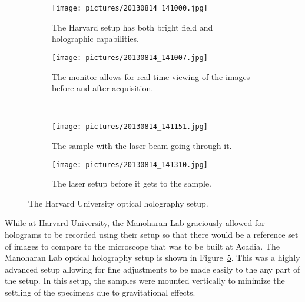 \begin{figure}[ht!]
    \begin{center}

        \begin{subfigure}[t]{0.4\textwidth}
            \label{fig:second}
            \texttt{[image: pictures/20130814\_141000.jpg]}
            \caption{The Harvard setup has both bright field and holographic
            capabilities.}
        \end{subfigure}
                \hspace*{\fill}
        \begin{subfigure}[t]{0.4\textwidth}
            \label{fig:third}
            \texttt{[image: pictures/20130814\_141007.jpg]}
            \caption{The monitor allows for real time viewing of the images
            before and after acquisition.}
        \end{subfigure}
        \\

        \begin{subfigure}[t]{0.4\textwidth}
            \label{fig:fourth}
            \texttt{[image: pictures/20130814\_141151.jpg]}
            \caption{The sample with the laser beam going through it.}
        \end{subfigure}
        \hspace*{\fill}
        \begin{subfigure}[t]{0.4\textwidth}%
            \label{fig:fifth}
            \texttt{[image: pictures/20130814\_141310.jpg]}
            \caption{The laser setup before it gets to the sample.}
        \end{subfigure}

    \end{center}
    \caption{%
        The Harvard University optical holography setup.
    }%
    \label{fig:harvardSetup}
\end{figure}

While at
Harvard University, the Manoharan Lab graciously allowed for holograms to be
recorded using their setup so that there would be a reference set of images to
compare to the microscope
that was to be built at Acadia. The Manoharan Lab optical holography setup is shown in
Figure~\ref{fig:harvardSetup}. This was a highly advanced setup allowing for
fine adjustments to be made easily to the any part of the setup. In this setup,
the samples were mounted vertically to minimize the settling of the specimens
due to gravitational effects.

